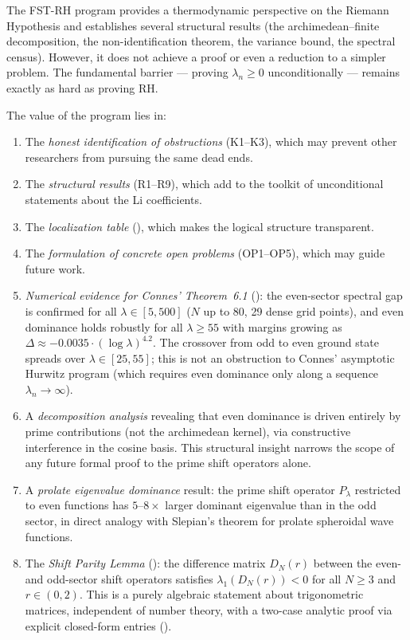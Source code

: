 \documentclass[12pt,a4paper]{article}
\theoremstyle{definition}
\theoremstyle{remark}
\begin{document}
The FST-RH program provides a thermodynamic perspective on the Riemann Hypothesis and establishes several structural results (the archimedean--finite decomposition, the non-identification theorem, the variance bound, the spectral census). However, it does not achieve a proof or even a reduction to a simpler problem. The fundamental barrier --- proving $\lambda_n \geq 0$ unconditionally --- remains exactly as hard as proving RH.

The value of the program lies in:
\begin{enumerate}
  \item The \emph{honest identification of obstructions} (K1--K3), which may prevent other researchers from pursuing the same dead ends.
  \item The \emph{structural results} (R1--R9), which add to the toolkit of unconditional statements about the Li coefficients.
  \item The \emph{localization table} (), which makes the logical structure transparent.
  \item The \emph{formulation of concrete open problems} (OP1--OP5), which may guide future work.
  \item \emph{Numerical evidence for Connes' Theorem~6.1} (): the even-sector spectral gap is confirmed for all $\lambda \in [5,500]$ ($N$ up to $80$, 29 dense grid points), and even dominance holds robustly for all $\lambda \geq 55$ with margins growing as $\Delta \approx -0.0035 \cdot (\log\lambda)^{4.2}$. The crossover from odd to even ground state spreads over $\lambda \in [25,55]$; this is not an obstruction to Connes' asymptotic Hurwitz program (which requires even dominance only along a sequence $\lambda_n \to \infty$).
  \item A \emph{decomposition analysis} revealing that even dominance is driven entirely by prime contributions (not the archimedean kernel), via constructive interference in the cosine basis. This structural insight narrows the scope of any future formal proof to the prime shift operators alone.
  \item A \emph{prolate eigenvalue dominance} result: the prime shift operator $P_\lambda$ restricted to even functions has $5$--$8\times$ larger dominant eigenvalue than in the odd sector, in direct analogy with Slepian's theorem for prolate spheroidal wave functions.
  \item The \emph{Shift Parity Lemma} (): the difference matrix $D_N(r)$ between the even- and odd-sector shift operators satisfies $\lambda_1(D_N(r)) < 0$ for all $N \geq 3$ and $r \in (0,2)$. This is a purely algebraic statement about trigonometric matrices, independent of number theory, with a two-case analytic proof via explicit closed-form entries ().

\end{enumerate}
\end{document}
